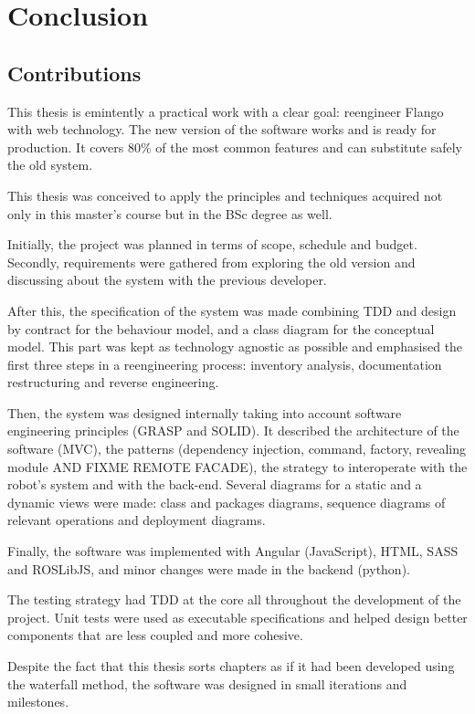 \chapter{Conclusion}
\section{Contributions}
This thesis is emintently a practical work with a clear goal: reengineer Flango \cm with web technology.
The new version of the software works and is ready for production.
It covers 80\% of the most common features and can substitute safely the old \flash system.


This thesis was conceived to apply the principles and techniques acquired not only in this master's course but in the BSc degree as well.

Initially, the project was planned in terms of scope, schedule and budget.
Secondly, requirements were gathered from exploring the old version and discussing about the system with the previous developer.

After this, the specification of the system was made combining \ac{TDD} and design by contract for the behaviour model, and a class diagram for the conceptual model.
This part was kept as technology agnostic as possible and emphasised the first three steps in a reengineering process: inventory analysis, documentation restructuring and reverse engineering.

Then, the system was designed internally taking into account software engineering principles (\ac{GRASP} and \ac{SOLID}).
It described the architecture of the software (\ac{MVC}), the patterns (dependency injection, command, factory, revealing module AND FIXME REMOTE FACADE), the strategy to interoperate with the robot's system and with the back-end.
Several diagrams for a static and a dynamic views were made: class and packages diagrams, sequence diagrams of relevant operations and deployment diagrams.

Finally, the software was implemented with Angular (JavaScript), HTML, SASS and ROSLibJS, and minor changes were made in the backend (python).

The testing strategy had \ac{TDD} at the core all throughout the development of the project.
Unit tests were used as executable specifications and helped design better components that are less coupled and more cohesive.

Despite the fact that this thesis sorts chapters as if it had been developed using the waterfall method, the software was designed in small iterations and milestones.

